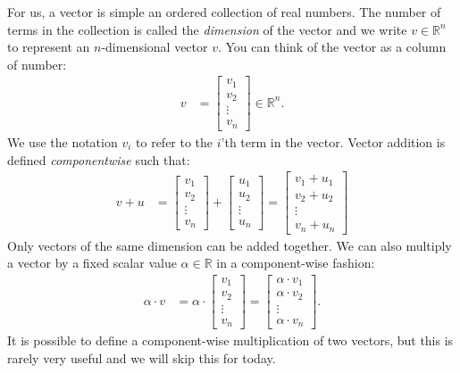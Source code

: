 \documentclass[12pt,hidelinks]{article}
\numberwithin{equation}{section}
\begin{document}
For us, a vector is simple an ordered collection of real numbers. The number
of terms in the collection is called the \textit{dimension} of the vector and
we write $v \in \mathbb{R}^n$ to represent an $n$-dimensional vector $v$. You
can think of the vector as a column of number:
\begin{align}
v &= \begin{bmatrix} v_1 \\ v_2 \\ \vdots \\ v_n \end{bmatrix} \in \mathbb{R}^n.
\end{align}
We use the notation $v_i$ to refer to the $i$'th term in the vector. Vector
addition is defined \textit{componentwise} such that:
\begin{align}
v + u &= \begin{bmatrix} v_1 \\ v_2 \\ \vdots \\ v_n \end{bmatrix} +
\begin{bmatrix} u_1 \\ u_2 \\ \vdots \\ u_n \end{bmatrix}
=\begin{bmatrix} v_1 + u_1 \\ v_2 + u_2 \\ \vdots \\ v_n + u_n \end{bmatrix}
\end{align}
Only vectors of the same dimension can be added together. We can also multiply
a vector by a fixed scalar value $\alpha \in \mathbb{R}$ in a component-wise
fashion:
\begin{align}
\alpha \cdot v &= \alpha \cdot \begin{bmatrix} v_1 \\ v_2 \\ \vdots \\ v_n \end{bmatrix}
= \begin{bmatrix} \alpha \cdot v_1 \\ \alpha \cdot v_2 \\ \vdots \\ \alpha \cdot v_n \end{bmatrix}.
\end{align}
It is possible to define a component-wise multiplication of two vectors, but
this is rarely very useful and we will skip this for today.
\end{document}
